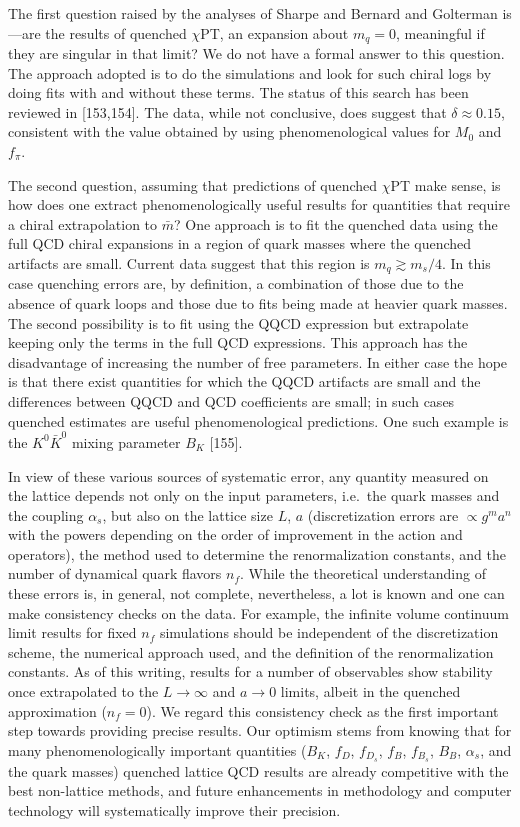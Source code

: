 The first question raised by the analyses of Sharpe and Bernard and Golterman is---are the results of quenched $\chi$PT, an expansion about $m_q = 0$, meaningful if they are singular in that limit? We do not have a formal answer to this question. The approach adopted is to do the simulations and look for such chiral logs by doing fits with and without these terms. The status of this search has been reviewed in [153,154]. The data, while not conclusive, does suggest that $\delta \approx 0.15$, consistent with the value obtained by using phenomenological values for $M_0$ and $f_\pi$.

The second question, assuming that predictions of quenched $\chi$PT make sense, is how does one extract phenomenologically useful results for quantities that require a chiral extrapolation to $\bar{m}$? One approach is to fit the quenched data using the full QCD chiral expansions in a region of quark masses where the quenched artifacts are small. Current data suggest that this region is $m_q \gtrsim m_s/4$. In this case quenching errors are, by definition, a combination of those due to the absence of quark loops and those due to fits being made at heavier quark masses. The second possibility is to fit using the QQCD expression but extrapolate keeping only the terms in the full QCD expressions. This approach has the disadvantage of increasing the number of free parameters. In either case the hope is that there exist quantities for which the QQCD artifacts are small and the differences between QQCD and QCD coefficients are small; in such cases quenched estimates are useful phenomenological predictions. One such example is the $K^0\bar{K}^0$ mixing parameter $B_K$ [155].

In view of these various sources of systematic error, any quantity measured on the lattice depends not only on the input parameters, i.e.~the quark masses and the coupling $\alpha_s$, but also on the lattice size $L$, $a$ (discretization errors are $\propto g^m a^n$ with the powers depending on the order of improvement in the action and operators), the method used to determine the renormalization constants, and the number of dynamical quark flavors $n_f$. While the theoretical understanding of these errors is, in general, not complete, nevertheless, a lot is known and one can make consistency checks on the data. For example, the infinite volume continuum limit results for fixed $n_f$ simulations should be independent of the discretization scheme, the numerical approach used, and the definition of the renormalization constants. As of this writing, results for a number of observables show stability once extrapolated to the $L \to \infty$ and $a \to 0$ limits, albeit in the quenched approximation ($n_f = 0$). We regard this consistency check as the first important step towards providing precise results. Our optimism stems from knowing that for many phenomenologically important quantities ($B_K$, $f_D$, $f_{D_s}$, $f_B$, $f_{B_s}$, $B_B$, $\alpha_s$, and the quark masses) quenched lattice QCD results are already competitive with the best non-lattice methods, and future enhancements in methodology and computer technology will systematically improve their precision.
